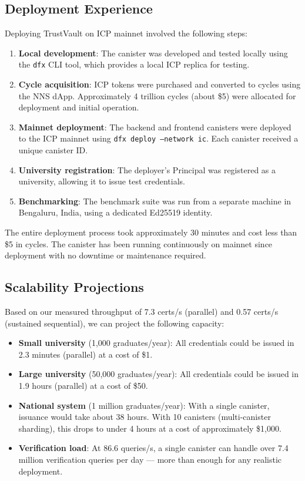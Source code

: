 \documentclass[journal]{IEEEtran}
\begin{document}
\subsection{Deployment Experience}

Deploying TrustVault on ICP mainnet involved the following steps:

\begin{enumerate}
  \item \textbf{Local development}: The canister was developed and tested locally using the \texttt{dfx} CLI tool, which provides a local ICP replica for testing.
  \item \textbf{Cycle acquisition}: ICP tokens were purchased and converted to cycles using the NNS dApp. Approximately 4 trillion cycles (about \$5) were allocated for deployment and initial operation.
  \item \textbf{Mainnet deployment}: The backend and frontend canisters were deployed to the ICP mainnet using \texttt{dfx deploy --network ic}. Each canister received a unique canister ID.
  \item \textbf{University registration}: The deployer's Principal was registered as a university, allowing it to issue test credentials.
  \item \textbf{Benchmarking}: The benchmark suite was run from a separate machine in Bengaluru, India, using a dedicated Ed25519 identity.
\end{enumerate}

The entire deployment process took approximately 30 minutes and cost less than \$5 in cycles. The canister has been running continuously on mainnet since deployment with no downtime or maintenance required.

\subsection{Scalability Projections}

Based on our measured throughput of 7.3 certs/s (parallel) and 0.57 certs/s (sustained sequential), we can project the following capacity:

\begin{itemize}[leftmargin=*]
  \item \textbf{Small university} (1,000 graduates/year): All credentials could be issued in 2.3 minutes (parallel) at a cost of \$1.
  \item \textbf{Large university} (50,000 graduates/year): All credentials could be issued in 1.9 hours (parallel) at a cost of \$50.
  \item \textbf{National system} (1 million graduates/year): With a single canister, issuance would take about 38 hours. With 10 canisters (multi-canister sharding), this drops to under 4 hours at a cost of approximately \$1,000.
  \item \textbf{Verification load}: At 86.6 queries/s, a single canister can handle over 7.4 million verification queries per day — more than enough for any realistic deployment.
\end{itemize}
\end{document}
